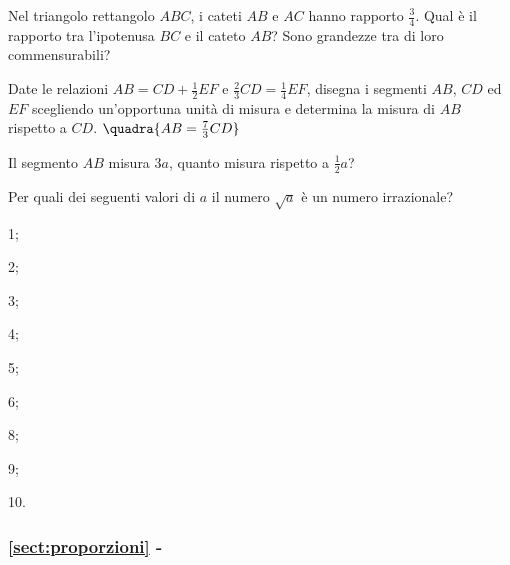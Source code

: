 \begin{esercizio}
\label{ese:6.9}
Nel triangolo rettangolo $ABC$, i cateti $AB$ e $AC$ hanno rapporto 
$\frac{3}{4}$. Qual è il rapporto tra  l'ipotenusa $BC$ e il cateto 
$AB$? Sono grandezze tra di loro commensurabili?
\end{esercizio}

\begin{esercizio}
\label{ese:6.10}
Date le relazioni $AB=CD+\frac{1}{2}EF$ e 
$\frac{2}{3}CD=\frac{1}{4}EF$, disegna i segmenti $AB$, $CD$ ed $EF$ 
scegliendo un'opportuna unità di misura e determina la misura di $AB$ 
rispetto a $CD$. 
\hfill$\quadra{AB=\frac{7}{3}CD}$
\end{esercizio}

\begin{esercizio}
\label{ese:6.11}
Il segmento $AB$ misura $3a$, quanto misura rispetto a 
$\frac{1}{2}a$? 
\end{esercizio}

\begin{esercizio}
\label{ese:6.12}
Per quali dei seguenti valori di $a$ il numero $\sqrt{a}$ è un numero 
irrazionale?
\begin{multicols}{5}
\begin{enumeratea}
\item 1;
\item 2;
\item 3;
\item 4;
\item 5;
\item 6;
\item 8;
\item 9;
\item 10.
\end{enumeratea}
\end{multicols}
\end{esercizio}

\begingroup
\hypersetup{linkcolor=black}
\subsubsection*{\ref{sect:proporzioni} - }
\endgroup

